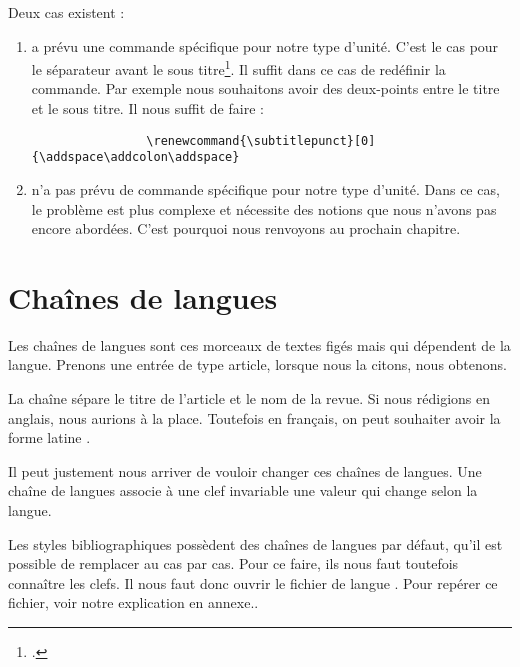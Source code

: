 	Deux cas existent :
		\begin{enumerate}
			\item {} a prévu une commande spécifique pour notre type d'unité. C'est le cas pour le séparateur avant le sous titre\footcite[Ces commandes sont peu nombreuse : on les trouvera dans][89-91]{biblatex_separateur_unites}. Il suffit dans ce cas de redéfinir la commande. Par exemple nous souhaitons avoir des deux-points entre le titre et le sous titre. Il nous suffit de faire :
			\begin{verbatim}
				\renewcommand{\subtitlepunct}[0]{\addspace\addcolon\addspace}
			\end{verbatim}
			
			\item {} n'a pas prévu de commande spécifique pour notre type d'unité. Dans ce cas, le problème est plus complexe et nécessite des notions que nous n'avons pas encore abordées. C'est pourquoi nous renvoyons au prochain chapitre.
		\end{enumerate}
		
	\section{Chaînes de langues}
	
	Les chaînes de langues sont ces morceaux de textes figés mais qui dépendent de la langue. Prenons une entrée de type article, lorsque nous la citons, nous obtenons.
	
	\begin{quotation}
		\cite{Junod1992}
	\end{quotation}
	
	La chaîne  sépare le titre de l'article et le nom de la revue. Si nous rédigions en anglais, nous aurions  à la place. Toutefois en français, on peut souhaiter avoir la forme latine . 
	
	Il peut justement nous arriver de vouloir changer ces chaînes de langues. Une chaîne de langues associe à une clef invariable une valeur qui change selon la langue.
	
	Les styles bibliographiques possèdent des chaînes de langues par défaut, qu'il est possible de remplacer au cas par cas. Pour ce faire, ils nous faut toutefois connaître les clefs. Il nous faut donc ouvrir le fichier de langue . Pour repérer ce fichier, voir notre explication en annexe..
	
